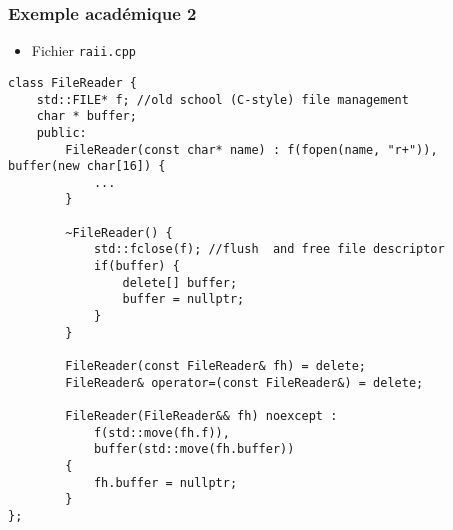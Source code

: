 \begin{frame}[containsverbatim]
\frametitle{Exemple académique 2}
\begin{itemize}
\item Fichier \texttt{raii.cpp}
\end{itemize}
\begin{lstlisting}
class FileReader {
    std::FILE* f; //old school (C-style) file management
    char * buffer;      
    public:
        FileReader(const char* name) : f(fopen(name, "r+")), buffer(new char[16]) {
            ...
        }
    
        ~FileReader() {
            std::fclose(f); //flush  and free file descriptor
            if(buffer) {
                delete[] buffer;                
                buffer = nullptr;
            }
        }
    
        FileReader(const FileReader& fh) = delete;    
        FileReader& operator=(const FileReader&) = delete;
        
        FileReader(FileReader&& fh) noexcept :
            f(std::move(fh.f)),
            buffer(std::move(fh.buffer)) 
        {
            fh.buffer = nullptr;
        }
};
\end{lstlisting}
\end{frame}

